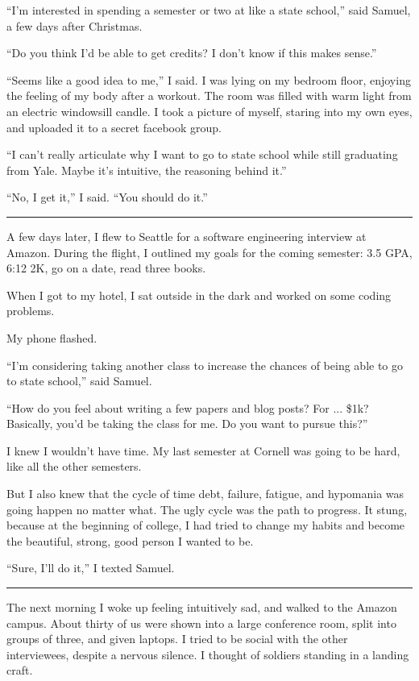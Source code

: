 ``I'm interested in spending a semester or two at like a state school,'' said
Samuel, a few days after Christmas.  

``Do you think I'd be able to get credits?  I don't know if this makes sense.''

``Seems like a good idea to me,'' I said.  I was lying on my bedroom floor,
enjoying the feeling of my body after a workout.  The room was filled with warm
light from an electric windowsill candle.  I took a picture of myself, staring
into my own eyes, and uploaded it to a secret facebook group. 

``I can't really articulate why I want to go to state school while still
graduating from Yale.  Maybe it's intuitive, the reasoning behind it.'' 

``No, I get it,'' I said. ``You should do it.''

\plainfancybreak{12pt}{2}{* * *}

A few days later, I flew to Seattle for a software engineering interview at
Amazon.  During the flight, I outlined my goals for the coming semester: 3.5 GPA,
6:12 2K, go on a date, read three books.  

When I got to my hotel, I sat outside in the dark and worked on some coding
problems. 

My phone flashed.

``I'm considering taking another class to increase the chances of being able to
go to state school,'' said Samuel.  

``How do you feel about writing a few papers and blog posts?  For ... \$1k?
Basically, you'd be taking the class for me.  Do you want to pursue this?'' 

I knew I wouldn't have time.  My last semester at Cornell was going to be hard,
like all the other semesters.

But I also knew that the cycle of time debt, failure, fatigue, and hypomania was
going happen no matter what.  The ugly cycle was the path to progress.  It
stung, because at the beginning of college, I had tried to change my habits and
become the beautiful, strong, good person I wanted to be.  

``Sure, I'll do it,'' I texted Samuel.

\plainfancybreak{12pt}{2}{* * *}

The next morning I woke up feeling intuitively sad, and walked to the Amazon
campus.  About thirty of us were shown into a large conference room, split into
groups of three, and given laptops.  I tried to be social with the other
interviewees, despite a nervous silence.  I thought of soldiers standing in a
landing craft. 

